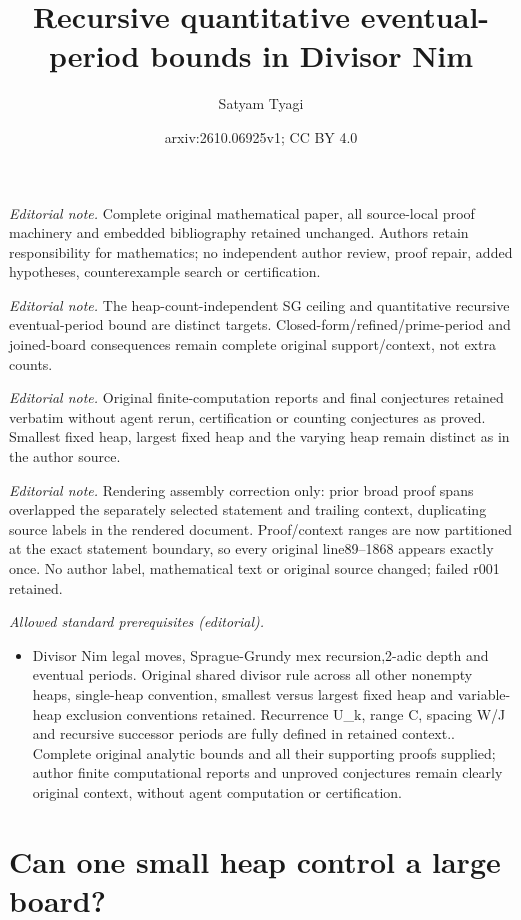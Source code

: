 \documentclass[10pt,a4paper]{article}
\title{Recursive quantitative eventual-period bounds in Divisor Nim}
\author{Satyam Tyagi}
\date{arxiv:2610.06925v1; CC BY 4.0}
\begin{document}
\maketitle
\noindent\textit{Editorial note.} Complete original mathematical paper, all source-local proof machinery and embedded bibliography retained unchanged. Authors retain responsibility for mathematics; no independent author review, proof repair, added hypotheses, counterexample search or certification.\par\medskip
\noindent\textit{Editorial note.} The heap-count-independent SG ceiling and quantitative recursive eventual-period bound are distinct targets. Closed-form/refined/prime-period and joined-board consequences remain complete original support/context, not extra counts.\par\medskip
\noindent\textit{Editorial note.} Original finite-computation reports and final conjectures retained verbatim without agent rerun, certification or counting conjectures as proved. Smallest fixed heap, largest fixed heap and the varying heap remain distinct as in the author source.\par\medskip
\noindent\textit{Editorial note.} Rendering assembly correction only: prior broad proof spans overlapped the separately selected statement and trailing context, duplicating source labels in the rendered document. Proof/context ranges are now partitioned at the exact statement boundary, so every original line89--1868 appears exactly once. No author label, mathematical text or original source changed; failed r001 retained.\par\medskip
\noindent\textit{Allowed standard prerequisites (editorial).}\begin{itemize}
\item Divisor Nim legal moves, Sprague-Grundy mex recursion,2-adic depth and eventual periods. Original shared divisor rule across all other nonempty heaps, single-heap convention, smallest versus largest fixed heap and variable-heap exclusion conventions retained. Recurrence U\_k, range C, spacing W/J and recursive successor periods are fully defined in retained context.. Complete original analytic bounds and all their supporting proofs supplied; author finite computational reports and unproved conjectures remain clearly original context, without agent computation or certification.
\end{itemize}\medskip
\section{Can one small heap control a large board?}
\label{sec:intro}
\end{document}
